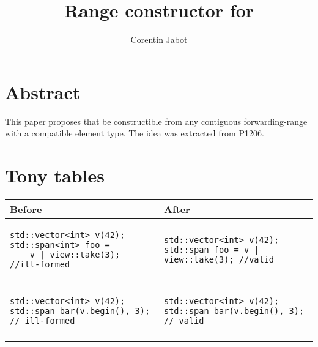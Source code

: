 \documentclass{wg21}
\title{Range constructor for \tcode{std::span}}
\author{Corentin Jabot}{corentin.jabot@gmail.com}
\begin{document}
\maketitle

\section{Abstract}

This paper proposes that  be constructible from any contiguous forwarding-range with a compatible element type.
The idea was extracted from P1206.

\section{Tony tables}
\begin{center}
\begin{tabular}{l|l}
Before & After\\ \hline

\begin{minipage}[t]{0.5\textwidth}
\begin{verbatim}
std::vector<int> v(42);
std::span<int> foo = 
    v | view::take(3); //ill-formed
\end{verbatim}
\end{minipage}
&
\begin{minipage}[t]{0.5\textwidth}
\begin{verbatim}
std::vector<int> v(42);
std::span foo = v | view::take(3); //valid
\end{verbatim}
\end{minipage}
\\\\ \hline


\begin{minipage}[t]{0.5\textwidth}
\begin{verbatim}
std::vector<int> v(42);
std::span bar(v.begin(), 3); // ill-formed
\end{verbatim}
\end{minipage}
&
\begin{minipage}[t]{0.5\textwidth}
\begin{verbatim}
std::vector<int> v(42);
std::span bar(v.begin(), 3); // valid

\end{verbatim}
\end{minipage}
\\\\ \hline


\end{tabular}
\end{center}
\end{document}
